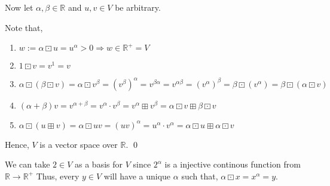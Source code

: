 \documentclass[10pt]{scrartcl}
\newcommand{\rn}{\mathbb{R}}
\begin{document}
\begin{enumerate}
\begin{enumerate}[label={(\roman*)}]
        Now let $\alpha, \beta \in \rn$ and $u, v \in V$ be arbitrary.
        
        Note that,
        \begin{enumerate}[label = {(\alph*)}]
            \item $w := \alpha \boxdot u = u^\alpha > 0 \Rightarrow w \in \rn^+ = V$
            \item $1 \boxdot v = v^1 = v$
            \item $\alpha \boxdot (\beta \boxdot v) = \alpha \boxdot v^\beta = (v^\beta)^\alpha =v^{\beta \alpha} = v^{\alpha \beta} =  (v^\alpha)^\beta = \beta \boxdot (v^\alpha) = \beta \boxdot (\alpha \boxdot v)$
            \item $(\alpha + \beta)v = v^{\alpha + \beta} = v^\alpha \cdot v^\beta = v^\alpha \boxplus v^\beta = \alpha \boxdot v \boxplus \beta \boxdot v$
            \item $\alpha \boxdot (u \boxplus v) = \alpha \boxdot uv = (uv)^\alpha = u^\alpha \cdot v^\alpha = \alpha \boxdot u \boxplus \alpha \boxdot v$
        \end{enumerate}

        Hence, $V$ is a vector space over $\rn$.  \qed

        We can take $2 \in V$ as a basis for $V$ since $2^\alpha$ is a injective continous function from $\rn \to \rn^+$ Thus, every $y \in V$ will have a unique $\alpha$ such that, $\alpha \boxdot x = x^\alpha = y$.
    \end{enumerate}
\end{enumerate}
\end{document}
